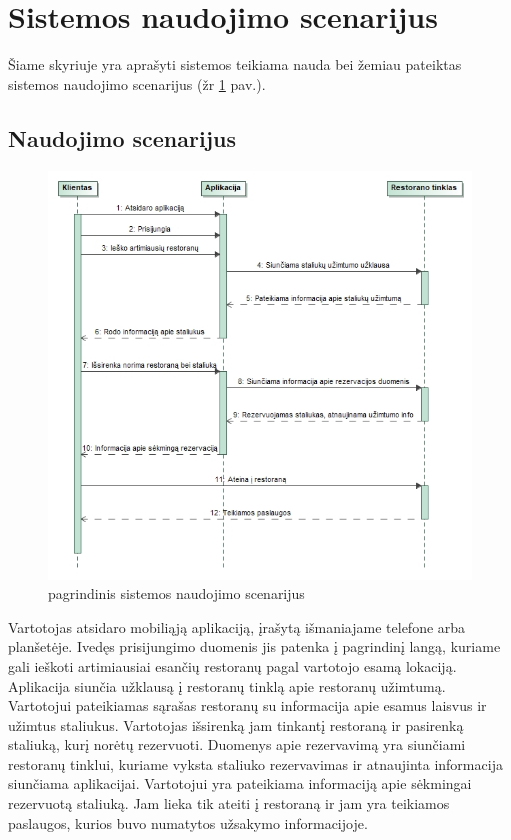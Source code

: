 \documentclass{VUMIFPSkursinis}
\begin{document}
\section{Sistemos naudojimo scenarijus}

Šiame skyriuje yra aprašyti sistemos teikiama nauda bei žemiau pateiktas sistemos naudojimo scenarijus (žr \ref{fig:maincase} pav.).

\subsection{Naudojimo scenarijus}
	\begin {figure}[H]
	\centering	
		\caption{pagrindinis sistemos naudojimo scenarijus}
		\includegraphics[scale=0.7]{img/3lab/MainCase.jpg}
		
		\label{fig:maincase}
	\end{figure}
Vartotojas atsidaro mobiliąją aplikaciją, įrašytą išmaniajame telefone arba planšetėje. Ivedęs prisijungimo duomenis jis patenka į pagrindinį langą, kuriame gali ieškoti artimiausiai esančių restoranų pagal vartotojo esamą lokaciją. Aplikacija siunčia užklausą į restoranų tinklą apie restoranų užimtumą. Vartotojui pateikiamas sąrašas restoranų su informacija apie esamus laisvus ir užimtus staliukus. Vartotojas išsirenką jam tinkantį restoraną ir pasirenką staliuką, kurį norėtų rezervuoti. Duomenys apie rezervavimą yra siunčiami restoranų tinklui, kuriame vyksta staliuko rezervavimas ir atnaujinta informacija siunčiama aplikacijai. Vartotojui yra pateikiama informaciją apie sėkmingai rezervuotą staliuką. Jam lieka tik ateiti į restoraną ir jam yra teikiamos paslaugos, kurios buvo numatytos užsakymo informacijoje.
\end{document}
